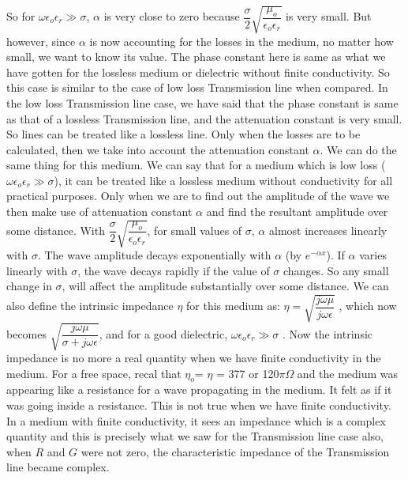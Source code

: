 So for $\omega\epsilon_{o}\epsilon_{r} \gg \sigma$, $\alpha$ is very close to zero because $\dfrac{\sigma}{2}\sqrt{\dfrac{\mu_{o}}{\epsilon_{o}\epsilon_{r}}}$ is very small. But however, since $\alpha$ is now accounting for the losses in the medium, no matter how small, we want to know its value. The phase constant here is same as what we have gotten for the lossless medium or dielectric without finite conductivity. So this case is similar to the case of low loss Transmission line when compared.
In the low loss Transmission line case, we have said that the phase constant is same as that of a lossless Transmission line, and the attenuation constant is very small. So lines can be treated like a lossless line. Only when the losses are to be calculated, then we take into account the attenuation constant $\alpha$. We can do the same thing for this medium. We can say that for a medium which is low loss ($\omega\epsilon_{o}\epsilon_{r} \gg \sigma$), it can be treated like a lossless medium without conductivity for all practical purposes. Only when we are to find out the amplitude of the wave we then make use of attenuation constant $\alpha$ and find the resultant amplitude over some distance. With $\dfrac{\sigma}{2}\sqrt{\dfrac{\mu_{o}}{\epsilon_{o}\epsilon_{r}}}$, for small values of $\sigma$, $\alpha$ almost increases linearly with $\sigma$. The wave amplitude decays exponentially with $\alpha$ (by $e^{-\alpha x}$). If $\alpha$ varies linearly with $\sigma$, the wave decays rapidly if the value of $\sigma$ changes. So any small change in $\sigma$, will affect the amplitude substantially over some distance. 
We can also define the intrinsic impedance $\eta$ for this medium as:
$\eta= \sqrt{\dfrac{j\omega\mu}{j\omega\epsilon}}$ , which now becomes $\sqrt{\dfrac{j\omega\mu}{\sigma + j\omega\epsilon}}$, and for a good dielectric, $\omega\epsilon_{o}\epsilon_{r} \gg \sigma$ . Now the intrinsic impedance is no more a real quantity when we have finite conductivity in the medium. For a free space, recal that $\eta_{o}$= $\eta$ = 377 or 120$\pi\Omega$ and the medium was appearing like a resistance for a wave propagating in the medium. It felt as if it was going inside a resistance. This is not true when we have finite conductivity. In a medium with finite conductivity, it sees an impedance which is a complex quantity and this is precisely what we saw for the Transmission line case also, when $R$ and $G$ were not zero, the characteristic impedance of the Transmission line became complex.